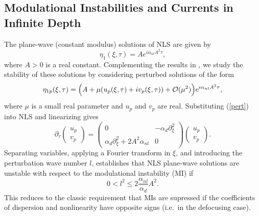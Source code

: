 \documentclass[a4paper,11pt]{article}
\newcommand{\bp}{\begin{pmatrix}}
\newcommand{\ep}{\end{pmatrix}}
\newcommand{\p}{\partial}
\begin{document}
\subsection{Modulational Instabilities and Currents in Infinite Depth}
The plane-wave (constant modulus) solutions of NLS are given by
\begin{equation}
\eta_{1}(\xi,\tau) = A e^{i\alpha_{nl}A^{2}\tau},
\end{equation}
where $A>0$ is a real constant.  Complementing the results in \cite{thomas2012nonlinear}, we study the
stability of these solutions by considering perturbed solutions of the form
\begin{equation}
\eta_{1p}(\xi,\tau) = \Big{(}A +\mu (u_{p}(\xi,\tau)+iv_{p}(\xi,\tau)) +\mathcal{O}(\mu^2)\Big{)}\mbox{e}^{i\alpha_{nl}A^{2}\tau},
\label{pert}
\end{equation}
where $\mu$ is a small real parameter and $u_{p}$ and $v_{p}$ are real.  Substituting (\ref{pert}) into NLS and linearizing gives 
\[
\p_{\tau}\bp u_{p}\\ v_{p}\ep = \bp 0 & -\alpha_{d}\p_{\xi}^{2} \\ \alpha_{d}\p_{\xi}^{2} + 2A^{2}\alpha_{nl} & 0 \ep \bp u_{p} \\ v_{p} \ep.
\]
Separating variables, applying a Fourier transform in $\xi$, and introducing the perturbation wave number $l$, establishes that NLS plane-wave solutions are unstable with respect to the modulational instability (MI) if
\[
0 < l^{2} \leq 2\frac{\alpha_{nl}}{\alpha_{d}}A^{2}.
\]
This reduces to the classic requirement that MIs are supressed if the coefficients of dispersion and nonlinearity have opposite signs (i.e.~in the defocusing case).  
\end{document}
